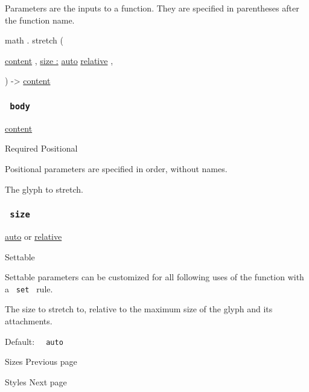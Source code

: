 \label{parameters-tooltip}
Parameters are the inputs to a function. They are specified in
parentheses after the function name.

math { . } { stretch } (

{ \href{/docs/reference/foundations/content/}{content} , } {
\hyperref[parameters-size]{size :}
\href{/docs/reference/foundations/auto/}{auto}
\href{/docs/reference/layout/relative/}{relative} , }

) -\textgreater{} \href{/docs/reference/foundations/content/}{content}

\subsubsection{\texorpdfstring{\texttt{\ body\ }}{ body }}\label{parameters-body}

\href{/docs/reference/foundations/content/}{content}

{Required} {{ Positional }}

\label{parameters-body-positional-tooltip}
Positional parameters are specified in order, without names.

The glyph to stretch.

\subsubsection{\texorpdfstring{\texttt{\ size\ }}{ size }}\label{parameters-size}

\href{/docs/reference/foundations/auto/}{auto} {or}
\href{/docs/reference/layout/relative/}{relative}

{{ Settable }}

\label{parameters-size-settable-tooltip}
Settable parameters can be customized for all following uses of the
function with a \texttt{\ set\ } rule.

The size to stretch to, relative to the maximum size of the glyph and
its attachments.

Default: \texttt{\ }{\texttt{\ auto\ }}\texttt{\ }

\href{/docs/reference/math/sizes/}{\pandocbounded{}}

{ Sizes } { Previous page }

\href{/docs/reference/math/styles/}{\pandocbounded{}}

{ Styles } { Next page }
